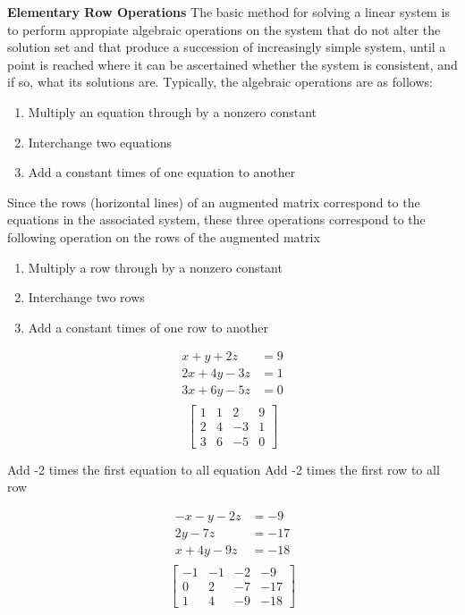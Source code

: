 \documentclass[a4paper, 12pt]{article}
\begin{document}
\textbf{Elementary Row Operations}
The basic method for solving a linear system is to perform appropiate 
algebraic operations on the system that do not alter the solution set 
and that produce a succession of increasingly simple system, until a 
point is reached where it can be ascertained whether the system is 
consistent, and if so, what its solutions are. Typically, the algebraic
operations are as follows:
\begin{enumerate}
\item Multiply an equation through by a nonzero constant
\item Interchange two equations
\item Add a constant times of one equation to another 
\end{enumerate}

Since the rows (horizontal lines) of an augmented matrix correspond
to the equations in the associated system, these three operations 
correspond to the following operation on the rows of the augmented
matrix 
\begin{enumerate}
\item Multiply a row through by a nonzero constant
\item Interchange two rows
\item Add a constant times of one row to another 
\end{enumerate}

\begin{multicols}{2}
\begin{align*}
x + y + 2z &= 9 \\
2x + 4y - 3z &= 1 \\
3x + 6y - 5z  &= 0\\
\end{align*}
\break
\[ \left[ {\begin{array}{cccc}
1 & 1 & 2 & 9 \\
2 & 4 & -3 & 1 \\
3 & 6 & -5 & 0
\end{array}} \right] \]
\end{multicols}

\begin{multicols}{2} 
Add -2 times the first equation to all equation
\break
Add -2 times the first row to all row
\end{multicols}

\begin{multicols}{2}
\begin{align*}
-x  -y - 2z &= -9 \\
2y - 7z &= -17 \\
x + 4y - 9z  &= -18\\
\end{align*}
\break
\[ \left[ {\begin{array}{cccc}
-1 & -1 & -2 & -9 \\
0 & 2 & -7 & -17 \\
1 & 4 & -9 & -18 
\end{array}} \right] \]
\end{multicols} 
\end{document}

